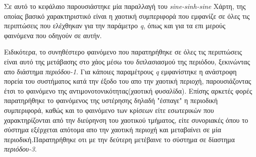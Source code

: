 Σε αυτό το κεφάλαιο παρουσιάστηκε μία παραλλαγή του \emph{sine-sinh-sine} Χάρτη, της οποίας βασικό χαρακτηριστικό είναι η χαοτική συμπεριφορά που εμφανίζε σε όλες τις περιπτώσεις που ελέχθηκαν για την παράμετρο \emph{q}, όπως και για τα επι μερούς φαινόμενα που οδηγούν σε αυτήν.

Ειδικότερα, το συνηθέστερο φαινόμενο που παρατηρήθηκε σε όλες τις περιπτώσεις είναι αυτό της μετάβασης στο χάος μέσω του διπλασιασμού της περιόδου, ξεκινώντας απο διάστημα \emph{περιόδου-1}.
Για κάποιες παραμέτρους  \emph{q} εμφανίστηκε η ανάστροφη πορεία του συστήματος κατά την έξοδο του απο την χαοτική περιοχή, παρουσιάζοντας έτσι το φαινόμενο της αντιμονοτονικότητας(χαοτική φυσαλίδα).
Επίσης αρκετές φορές παρατηρήθηκε το φαινόμενος της υστέρησης δηλαδή "έσπαγε" η περιοδική συμπεριφορά, καθώς και το φαινόμενο των κρίσεων είτε εσωτερικών που χαρακτηρίζονται από την διεύρηνση του χαοτικού τμήματος, είτε συνοριακές όπου το σύστημα εξέρχεται απότομα απο την χαοτική περιοχή και μεταβαίνει σε μία περιοδική.Παρατηρήθηκε οτι με  την δεύτερη μετέβαινε το σύστημα σε δίαστημα \emph{περιόδου-3}.